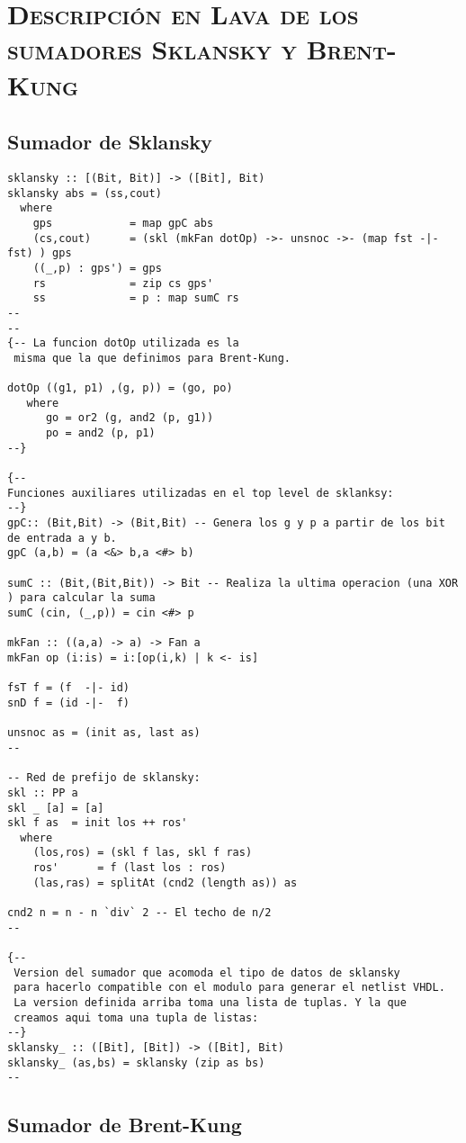 \chapter{\textsc{ Descripción en Lava de los sumadores Sklansky y Brent-Kung}}\label{chap:sklansky-lava}
\section{Sumador de Sklansky}
\lstset{language=Haskell} 
\begin{lstlisting}
sklansky :: [(Bit, Bit)] -> ([Bit], Bit)
sklansky abs = (ss,cout)
  where
    gps            = map gpC abs
    (cs,cout)      = (skl (mkFan dotOp) ->- unsnoc ->- (map fst -|- fst) ) gps
    ((_,p) : gps') = gps
    rs             = zip cs gps'
    ss             = p : map sumC rs
--
-- 
{-- La funcion dotOp utilizada es la
 misma que la que definimos para Brent-Kung.

dotOp ((g1, p1) ,(g, p)) = (go, po)
   where
      go = or2 (g, and2 (p, g1))
      po = and2 (p, p1)
--}

{--
Funciones auxiliares utilizadas en el top level de sklanksy:
--}
gpC:: (Bit,Bit) -> (Bit,Bit) -- Genera los g y p a partir de los bit de entrada a y b.
gpC (a,b) = (a <&> b,a <#> b)

sumC :: (Bit,(Bit,Bit)) -> Bit -- Realiza la ultima operacion (una XOR ) para calcular la suma
sumC (cin, (_,p)) = cin <#> p

mkFan :: ((a,a) -> a) -> Fan a
mkFan op (i:is) = i:[op(i,k) | k <- is]

fsT f = (f  -|- id)
snD f = (id -|-  f)

unsnoc as = (init as, last as)
--

-- Red de prefijo de sklansky:
skl :: PP a
skl _ [a] = [a]
skl f as  = init los ++ ros'
  where
    (los,ros) = (skl f las, skl f ras)
    ros'      = f (last los : ros)
    (las,ras) = splitAt (cnd2 (length as)) as

cnd2 n = n - n `div` 2 -- El techo de n/2
--

{--
 Version del sumador que acomoda el tipo de datos de sklansky
 para hacerlo compatible con el modulo para generar el netlist VHDL.
 La version definida arriba toma una lista de tuplas. Y la que 
 creamos aqui toma una tupla de listas:
--}
sklansky_ :: ([Bit], [Bit]) -> ([Bit], Bit) 
sklansky_ (as,bs) = sklansky (zip as bs)
--

\end{lstlisting}


\section{Sumador de Brent-Kung}

